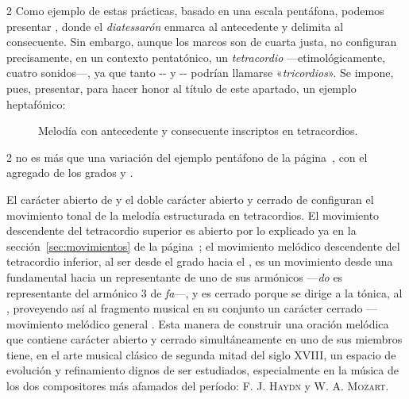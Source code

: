\documentclass[a4paper,11pt]{article}
\begin{document}
\begin{multicols}{2}
  Como ejemplo de estas prácticas, basado en una escala pentáfona, podemos presentar
  \hbox{,}\label{ej:tetra-penta} donde el \emph{diatessarón}  enmarca al antecedente y  delimita al consecuente. Sin embargo, aunque los marcos son de cuarta justa, no configuran precisamente, en un contexto pentatónico, un \emph{tetracordio} ---etimológicamente, cuatro sonidos---, ya que tanto -- y -- podrían llamarse «\emph{tricordios}». Se impone, pues, presentar, para hacer honor al título de este apartado, un ejemplo heptafónico:
  \end{multicols}

  \begin{figure}[ht]
\centering
\caption{Melodía con antecedente y consecuente inscriptos en tetracordios.}\label{fig:tetra-hepta}
\end{figure}

\begin{multicols}{2}
  \noindent no es más que una variación del ejemplo pentáfono de la página~\pageref{ej:tetra-penta}, con el agregado de los grados  y .

  El carácter abierto de  y el doble carácter abierto y cerrado de  configuran el movimiento tonal de la melodía estructurada en tetracordios. El movimiento descendente del tetracordio superior es abierto por lo explicado ya en la sección~\ref{sec:movimientos} de la página~\pageref{sec:movimientos}; el movimiento melódico descendente del tetracordio inferior, al ser desde el  grado hacia el , es un movimiento desde una fundamental hacia un representante de uno de sus armónicos ---\emph{do} es representante del armónico 3 de \emph{fa}---, y es cerrado porque se dirige a la tónica, al , proveyendo así al fragmento musical en su conjunto un carácter cerrado ---movimiento melódico general . Esta manera de construir una oración melódica que contiene carácter abierto y cerrado simultáneamente en uno de sus miembros tiene, en el arte musical clásico de segunda mitad del siglo XVIII, un espacio de evolución y refinamiento dignos de ser estudiados, especialmente en la música de los dos compositores más afamados del período: \textsc{F. J. Haydn} y \textsc{W. A. Mozart}.
\end{multicols}
\end{document}
